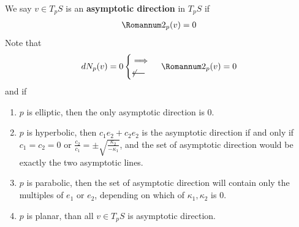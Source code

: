 \documentclass{report}
\begin{document}
\begin{mdframed}
  We say $v \in T_pS$ is an \textbf{asymptotic direction} in $T_pS$ if 
\begin{align*}
\Sec_p(v)=0
\end{align*}
Note that 
\begin{align*}
dN_p(v)=0 \begin{cases}
  \implies \\
\not \longleftarrow
\end{cases} \Sec_p(v)=0
\end{align*}
and if 
\begin{enumerate}[label=(\alph*)]
  \item $p$ is elliptic, then the only asymptotic direction is $0$.
  \item $p$ is hyperbolic, then $c_1e_2+c_2e_2$ is the asymptotic direction if and only if  $c_1=c_2=0$ or  $\frac{c_2}{c_1}=\pm \sqrt{\frac{\kappa_2}{-\kappa_1}} $, and the set of asymptotic direction would be exactly the two asymptotic lines. 
  \item $p$ is parabolic, then the set of asymptotic direction will contain only the multiples of $e_1$ or  $e_2$, depending on which of   $\kappa_1,\kappa_2$ is $0$. 
  \item $p $ is planar, than all $v \in T_pS$ is asymptotic direction. 
\end{enumerate}
\end{mdframed}
\end{document}
